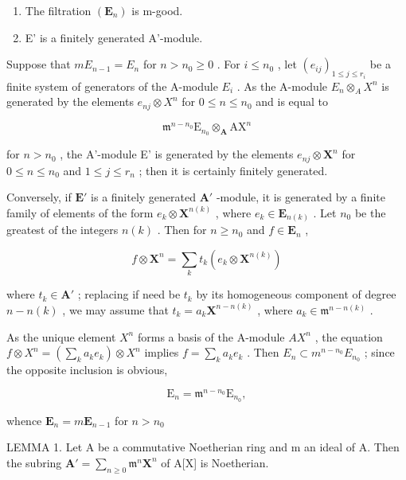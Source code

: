 \begin{enumerate}
\def\labelenumi{(\alph{enumi})}
\item
  The filtration \((\mathbf{E}_n)\) is m-good.
\item
  E' is a finitely generated A'-module.
\end{enumerate}

Suppose that \(mE_{n-1} = E_n\) for \(n > n_0 \geqslant 0\) . For \(i \leqslant n_0\) , let \((e_{ij})_{1 \leqslant j \leqslant r_i}\) be a finite system of generators of the A-module \(E_i\) . As the A-module \(E_n \otimes_A X^n\) is generated by the elements \(e_{nj} \otimes X^n\) for \(0 \leqslant n \leqslant n_0\) and is equal to

\[
\mathfrak {m} ^ {n - n _ {0}} \mathrm{E} _ {n _ {0}} \otimes_ {\mathbf {A}} \mathrm{AX} ^ {n}
\]

for \(n > n_0\) , the A'-module E' is generated by the elements \(e_{nj} \otimes \mathbf{X}^n\) for \(0 \leqslant n \leqslant n_0\) and \(1 \leqslant j \leqslant r_n\) ; then it is certainly finitely generated.

Conversely, if \(\mathbf{E}'\) is a finitely generated \(\mathbf{A}'\) -module, it is generated by a finite family of elements of the form \(e_k \otimes \mathbf{X}^{n(k)}\) , where \(e_k \in \mathbf{E}_{n(k)}\) . Let \(n_0\) be the greatest of the integers \(n(k)\) . Then for \(n \geqslant n_0\) and \(f \in \mathbf{E}_n\) ,

\[
f \otimes \mathbf {X} ^ {n} = \sum_ {k} t _ {k} (e _ {k} \otimes \mathbf {X} ^ {n (k)})
\]

where \(t_k \in \mathbf{A}'\) ; replacing if need be \(t_k\) by its homogeneous component of degree \(n - n(k)\) , we may assume that \(t_k = a_k \mathbf{X}^{n - n(k)}\) , where \(a_k \in \mathfrak{m}^{n - n(k)}\) .

As the unique element \(X^{n}\) forms a basis of the A-module \(AX^{n}\) , the equation \(f \otimes X^{n} = \left( \sum_{k} a_{k} e_{k} \right) \otimes X^{n}\) implies \(f = \sum_{k} a_{k} e_{k}\) . Then \(E_{n} \subset m^{n-n_{0}} E_{n_{0}}\) ; since the opposite inclusion is obvious,

\[
\mathrm{E} _ {n} = \mathfrak {m} ^ {n - n _ {0}} \mathrm{E} _ {n _ {0}},
\]

whence \(\mathbf{E}_n = m\mathbf{E}_{n - 1}\) for \(n > n_0\)

LEMMA 1. Let A be a commutative Noetherian ring and m an ideal of A. Then the subring \(\mathbf{A}' = \sum_{n\geqslant 0}\mathfrak{m}^n\mathbf{X}^n\) of A{[}X{]} is Noetherian.

